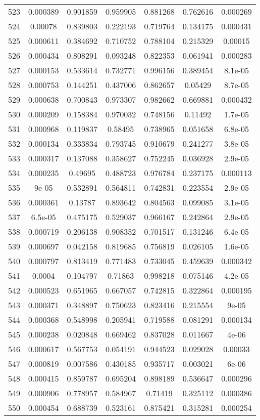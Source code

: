 \begin{table}
\begin{tabular}{c|c|c|c|c|c|c}
523 & 0.000389 & 0.901859 & 0.959905 & 0.881268 & 0.762616 & 0.000269\\
524 & 0.00078 & 0.839803 & 0.222193 & 0.719764 & 0.134175 & 0.000431\\
525 & 0.000611 & 0.384692 & 0.710752 & 0.788104 & 0.215329 & 0.00015\\
526 & 0.000434 & 0.808291 & 0.093248 & 0.822353 & 0.061941 & 0.000283\\
527 & 0.000153 & 0.533614 & 0.732771 & 0.996156 & 0.389454 & 8.1e-05\\
528 & 0.000753 & 0.144251 & 0.437006 & 0.862657 & 0.05429 & 8.7e-05\\
529 & 0.000638 & 0.700843 & 0.973307 & 0.982662 & 0.669881 & 0.000432\\
530 & 0.000209 & 0.158384 & 0.970032 & 0.748156 & 0.11492 & 1.7e-05\\
531 & 0.000968 & 0.119837 & 0.58495 & 0.738965 & 0.051658 & 6.8e-05\\
532 & 0.000134 & 0.333834 & 0.793745 & 0.910679 & 0.241277 & 3.8e-05\\
533 & 0.000317 & 0.137088 & 0.358627 & 0.752245 & 0.036928 & 2.9e-05\\
534 & 0.000235 & 0.49695 & 0.488723 & 0.976784 & 0.237175 & 0.000113\\
535 & 9e-05 & 0.532891 & 0.564811 & 0.742831 & 0.223554 & 2.9e-05\\
536 & 0.000361 & 0.13787 & 0.893642 & 0.804563 & 0.099085 & 3.1e-05\\
537 & 6.5e-05 & 0.475175 & 0.529037 & 0.966167 & 0.242864 & 2.9e-05\\
538 & 0.000719 & 0.206138 & 0.908352 & 0.701517 & 0.131246 & 6.4e-05\\
539 & 0.000697 & 0.042158 & 0.819685 & 0.756819 & 0.026105 & 1.6e-05\\
540 & 0.000797 & 0.813419 & 0.771483 & 0.733045 & 0.459639 & 0.000342\\
541 & 0.0004 & 0.104797 & 0.71863 & 0.998218 & 0.075146 & 4.2e-05\\
542 & 0.000523 & 0.651965 & 0.667057 & 0.742815 & 0.322864 & 0.000195\\
543 & 0.000371 & 0.348897 & 0.750623 & 0.823416 & 0.215554 & 9e-05\\
544 & 0.000368 & 0.548998 & 0.205941 & 0.719588 & 0.081291 & 0.000134\\
545 & 0.000238 & 0.020848 & 0.669462 & 0.837028 & 0.011667 & 4e-06\\
546 & 0.000617 & 0.567753 & 0.054191 & 0.944523 & 0.029028 & 0.00033\\
547 & 0.000819 & 0.007586 & 0.430185 & 0.935717 & 0.003021 & 6e-06\\
548 & 0.000415 & 0.859787 & 0.695204 & 0.898189 & 0.536647 & 0.000296\\
549 & 0.000906 & 0.778957 & 0.584967 & 0.71419 & 0.325112 & 0.000386\\
550 & 0.000454 & 0.688739 & 0.523161 & 0.875421 & 0.315281 & 0.000254\\
\end{tabular}
\end{table}
